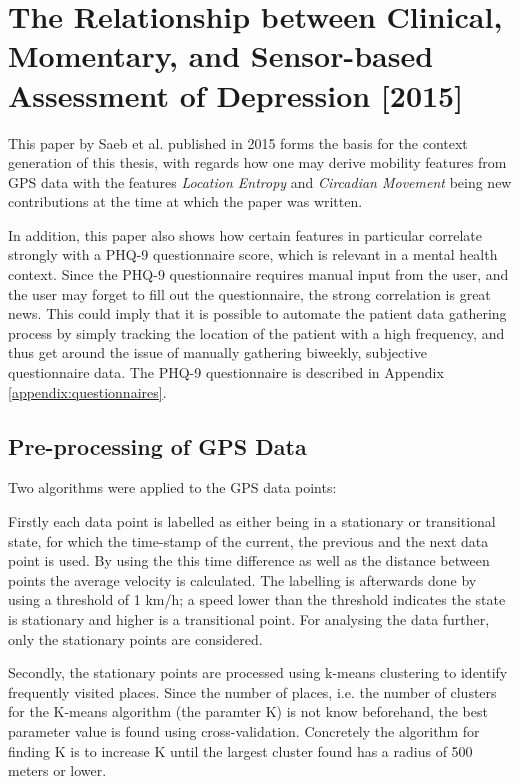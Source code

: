 \section{The Relationship between Clinical, Momentary, and Sensor-based Assessment of Depression [2015]}
This paper by Saeb et al. published in 2015 \cite{Saeb2015} forms the basis for the context generation of this thesis, with regards how one may derive mobility features from GPS data with the features \textit{Location Entropy} and \textit{Circadian Movement} being new contributions at the time at which the paper was written. 

In addition, this paper also shows how certain features in particular correlate strongly with a PHQ-9 questionnaire score, which is relevant in a mental health context. Since the PHQ-9 questionnaire requires manual input from the user, and the user may forget to fill out the questionnaire, the strong correlation is great news. This could imply that it is possible to automate the patient data gathering process by simply tracking the location of the patient with a high frequency, and thus get around the issue of manually gathering biweekly, subjective questionnaire data. The PHQ-9 questionnaire is described in Appendix \ref{appendix:questionnaires}.

\subsection{Pre-processing of GPS Data}
Two algorithms were applied to the GPS data points:

Firstly each data point is labelled as either being in a stationary or transitional state, for which the time-stamp of the current, the previous and the next data point is used. By using the this time difference as well as the distance between points the average velocity is calculated. The labelling is afterwards done by using a threshold of 1 km/h; a speed lower than the threshold indicates the state is stationary and higher is a transitional point. For analysing the data further, only the stationary points are considered.

Secondly, the stationary points are processed using k-means clustering to identify frequently visited places. Since the number of places, i.e. the number of clusters for the K-means algorithm (the paramter K) is not know beforehand, the best parameter value is found using cross-validation. Concretely the algorithm for finding K is to increase K until the largest cluster found has a radius of 500 meters or lower.

